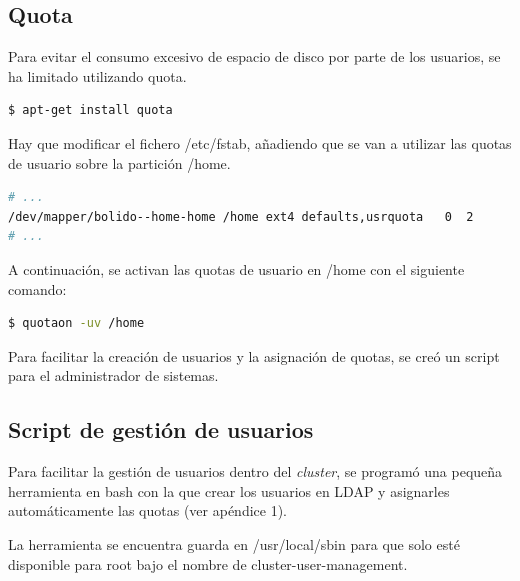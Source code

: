 \subsection{Quota}

Para evitar el consumo excesivo de espacio de disco por parte de los usuarios, se ha limitado utilizando quota.

\vspace{2mm}
\begin{lstlisting}[language=bash]
    $ apt-get install quota
\end{lstlisting}
\vspace{2mm}

Hay que modificar el fichero /etc/fstab, añadiendo que se van a utilizar las quotas de usuario sobre la partición /home.
\vspace{4mm}

\begin{lstlisting}[language=bash, caption={Configuración /etc/fstab en Bolido para Quotas}]
# ...
/dev/mapper/bolido--home-home /home ext4 defaults,usrquota   0  2
# ...
\end{lstlisting}
\vspace{4mm}

A continuación, se activan las quotas de usuario en /home con el siguiente comando:

\vspace{2mm}
\begin{lstlisting}[language=bash]
    $ quotaon -uv /home
\end{lstlisting}
\vspace{2mm}

Para facilitar la creación de usuarios y la asignación de quotas, se creó un script para el administrador de sistemas.

\subsection{Script de gestión de usuarios}

Para facilitar la gestión de usuarios dentro del \emph{cluster}, se programó una pequeña herramienta en bash con la que crear los usuarios en LDAP y asignarles automáticamente las quotas (ver apéndice 1). 
\vspace{4mm}

La herramienta se encuentra guarda en /usr/local/sbin para que solo esté disponible para root bajo el nombre de cluster-user-management.
\vspace{4mm} 

